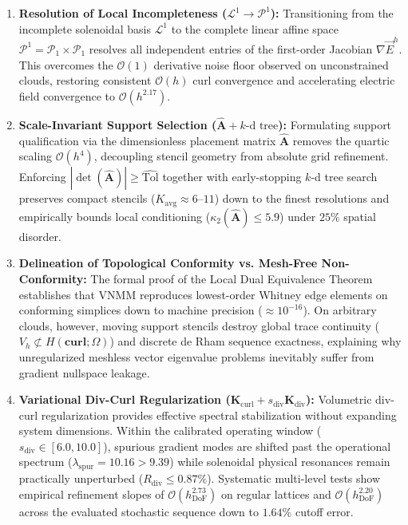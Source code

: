 \documentclass[preprint,12pt]{elsarticle}
\begin{document}
\begin{enumerate}
    \item \textbf{Resolution of Local Incompleteness ($\mathcal{L}^1 \to \mathcal{P}^1$):}
          Transitioning from the incomplete solenoidal basis $\mathcal{L}^1$ to the complete linear affine space $\mathcal{P}^1 = \mathcal{P}_1 \times \mathcal{P}_1$ resolves all independent entries of the first-order Jacobian $\nabla \vec{E}^h$. This overcomes the $\mathcal{O}(1)$ derivative noise floor observed on unconstrained clouds, restoring consistent $\mathcal{O}(h)$ curl convergence and accelerating electric field convergence to $\mathcal{O}(h^{2.17})$.

    \item \textbf{Scale-Invariant Support Selection ($\widehat{\mathbf{A}} + \text{$k$-d tree}$):}
          Formulating support qualification via the dimensionless placement matrix $\widehat{\mathbf{A}}$ removes the quartic scaling $\mathcal{O}(h^4)$, decoupling stencil geometry from absolute grid refinement. Enforcing $|\det(\widehat{\mathbf{A}})| \ge \widehat{\mathrm{Tol}}$ together with early-stopping $k$-d tree search preserves compact stencils ($K_{\mathrm{avg}} \approx 6\text{--}11$) down to the finest resolutions and empirically bounds local conditioning ($\kappa_2(\widehat{\mathbf{A}}) \le 5.9$) under $25\%$ spatial disorder.

    \item \textbf{Delineation of Topological Conformity vs. Mesh-Free Non-Conformity:}
          The formal proof of the Local Dual Equivalence Theorem establishes that VNMM reproduces lowest-order Whitney edge elements on conforming simplices down to machine precision ($\approx 10^{-16}$). On arbitrary clouds, however, moving support stencils destroy global trace continuity ($V_h \not\subset H(\mathbf{curl}; \Omega)$) and discrete de Rham sequence exactness, explaining why unregularized meshless vector eigenvalue problems inevitably suffer from gradient nullspace leakage.

    \item \textbf{Variational Div-Curl Regularization ($\mathbf{K}_{\mathrm{curl}} + s_{\mathrm{div}} \mathbf{K}_{\mathrm{div}}$):}
          Volumetric div-curl regularization provides effective spectral stabilization without expanding system dimensions. Within the calibrated operating window ($s_{\mathrm{div}} \in [6.0, 10.0]$), spurious gradient modes are shifted past the operational spectrum ($\lambda_{\mathrm{spur}} = 10.16 > 9.39$) while solenoidal physical resonances remain practically unperturbed ($R_{\mathrm{div}} \le 0.87\%$). Systematic multi-level tests show empirical refinement slopes of $\mathcal{O}(h_{\mathrm{DoF}}^{2.73})$ on regular lattices and $\mathcal{O}(h_{\mathrm{DoF}}^{2.20})$ across the evaluated stochastic sequence down to $1.64\%$ cutoff error.


\end{enumerate}
\end{document}
